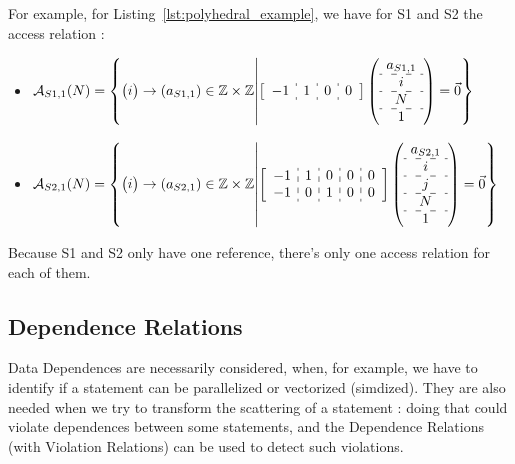 \documentclass[paper=a4, fontsize=11.5pt]{scrartcl}
\numberwithin{equation}{section}        %
\numberwithin{figure}{section}          %
\numberwithin{table}{section}               %
\begin{document}
        For example, for Listing~\ref{lst:polyhedral_example}, we have for S1 and S2 the
        access relation :
        \begin{itemize}
            \item[]
                $
                \mathcal{A}_{S1,1}(N) = 
                \left\{
                \begin{pmatrix}i\end{pmatrix} \to \left(a_{S1,1}\right) \in \mathbb{Z}\times\mathbb{Z}
                    \middle|
                    \left[\begin{array}{c:c:c:c}-1 & 1 & 0 & 0 \end{array}\right]
                    \left(\begin{array}{c}a_{S1,1}\\\hdashline i\\\hdashline N\\\hdashline 1\end{array}\right)
                    = \vec{0}
                \right\}
                $
            
            \item[]
                $
                \mathcal{A}_{S2,1}(N) = 
                \left\{
                \begin{pmatrix}i\end{pmatrix} \to \left(a_{S2,1}\right) \in \mathbb{Z}\times\mathbb{Z}
                    \middle|
                    \left[\begin{array}{c:c:c:c:c}-1 & 1 & 0 & 0 & 0 \\
                                                  -1 & 0 & 1 & 0 & 0 \end{array}\right]
                    \left(\begin{array}{c}a_{S2,1}\\\hdashline i\\\hdashline j\\\hdashline N\\\hdashline 1\end{array}\right)
                    = \vec{0}
                \right\}
                $
        \end{itemize}

        Because S1 and S2 only have one reference, there's only one access relation for
        each of them.

    \subsection{Dependence Relations}
    \label{sec:dependence_relations}
        Data Dependences are necessarily considered, when, for example, we have to identify if a statement
        can be parallelized or vectorized (simdized). They are also needed when we try to
        transform the scattering of a statement : doing that could violate dependences between
        some statements, and the Dependence Relations (with Violation Relations) can be used to detect such
        violations.
\end{document}
